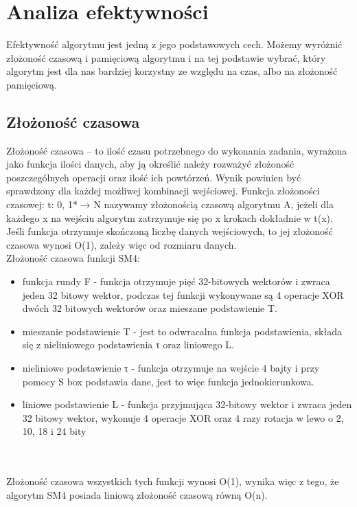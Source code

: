 \section{Analiza efektywności}

Efektywność algorytmu jest jedną z jego podstawowych cech. Możemy wyróżnić złożoność czasową i pamięciową algorytmu i na tej podstawie wybrać, który algorytm jest dla nas bardziej korzystny ze względu na czas, albo na złożoność pamięciową.\\

\subsection{ Złożoność czasowa}
Złożoność czasowa – to ilość czasu potrzebnego do wykonania zadania, wyrażona jako funkcja ilości danych, aby ją określić należy rozważyć złożoność poszczególnych operacji oraz ilość ich powtórzeń. Wynik powinien być sprawdzony dla każdej możliwej kombinacji wejściowej. Funkcja złożoności czasowej: t: {0, 1}* → N nazywamy złożonością czasową algorytmu A, jeżeli dla każdego x na wejściu algorytm zatrzymuje się po x krokach dokładnie w t(x). Jeśli funkcja otrzymuje skończoną liczbę danych wejściowych, to jej złożoność czasowa wynosi O(1), zależy więc od rozmiaru danych.\\

Złożoność czasowa funkcji SM4:
\begin{itemize}
    \item funkcja rundy F -  funkcja otrzymuje pięć 32-bitowych wektorów i zwraca jeden 32 bitowy wektor, podczas tej funkcji wykonywane są 4 operacje XOR dwóch 32 bitowych wektorów oraz mieszane podstawienie T.
    \item mieszanie podstawienie T - jest to odwracalna funkcja podstawienia, składa się z nieliniowego podstawienia τ oraz liniowego L.
    \item nieliniowe podstawienie τ - funkcja otrzymuje na wejście 4 bajty i przy pomocy S box podstawia dane, jest to więc funkcja jednokierunkowa.
    \item liniowe podstawienie L - funkcja przyjmująca 32-bitowy wektor i zwraca jeden 32 bitowy wektor, wykonuje 4 operacje XOR oraz 4 razy rotacja w lewo o 2, 10, 18 i 24 bity\\

\end{itemize}\\\\

Złożoność czasowa wszystkich tych funkcji wynosi O(1), wynika więc z tego, że algorytm SM4 posiada liniową złożoność czasową równą O(n).


